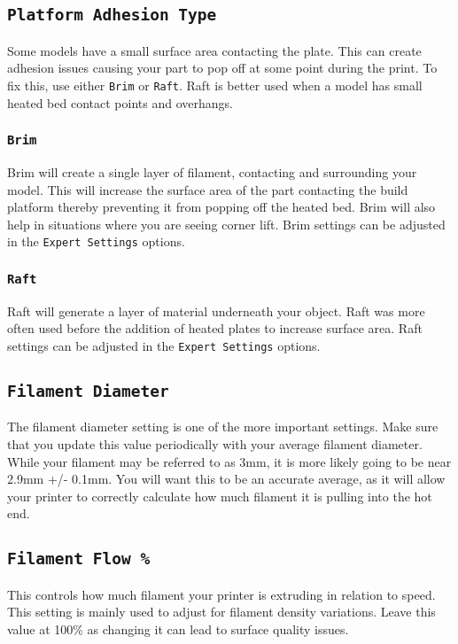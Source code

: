\subsection{\texttt{Platform Adhesion Type}}
Some models have a small surface area contacting the plate. This can create adhesion issues causing your part to pop off at some point during the print. To fix this, use either \texttt{Brim} or \texttt{Raft}. Raft is better used when a model has small heated bed contact points and overhangs.

\subsubsection{\texttt{Brim}}
Brim will create a single layer of filament, contacting and surrounding your model. This will increase the surface area of the part contacting the build platform thereby preventing it from popping off the heated bed. Brim will also help in situations where you are seeing corner lift. Brim settings can be adjusted in the \texttt{Expert Settings} options.

\subsubsection{\texttt{Raft}}
Raft will generate a layer of material underneath your object. Raft was more often used before the addition of heated plates to increase surface area. Raft settings can be adjusted in the \texttt{Expert Settings} options.

\subsection{\texttt{Filament Diameter}}
The filament diameter setting is one of the more important settings. Make sure that you update this value periodically with your average filament diameter. While your filament may be referred to as 3mm, it is more likely going to be near 2.9mm +/- 0.1mm. You will want this to be an accurate average, as it will allow your printer to correctly calculate how much filament it is pulling into the hot end.

\subsection{\texttt{Filament Flow \%}}
This controls how much filament your printer is extruding in relation to speed. This setting is mainly used to adjust for filament density variations. Leave this value at 100\% as changing it can lead to surface quality issues.

